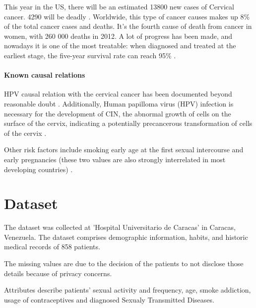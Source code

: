 This year in the US, there will be an estimated 13800 new cases of Cervical cancer. 4290 will be deadly \cite{acs}.
Worldwide, this type of cancer causes makes up 8\% of the total cancer cases and deaths. It's the fourth cause of death from cancer in women, with 260 000 deaths in 2012.
A lot of progress has been made, and nowadays it is one of the most treatable: when diagnosed and treated at the earliest stage, the five-year survival rate can reach 95\% \cite{cruk}.

\paragraph{Known causal relations}

HPV causal relation with the cervical cancer has been documented beyond reasonable doubt \cite{Bosch2002}. Additionally, Human papilloma virus (HPV) infection is necessary for the development of CIN, the abnormal growth of cells on the surface of the cervix, indicating a potentially precancerous transformation of cells of the cervix \cite{kumar2017robbins}.

Other risk factors include smoking \cite{Collins2010} early age at the first sexual intercourse and early pregnancies (these two values are also strongly interrelated in most developing countries) \cite{Louie2009}.

\section{Dataset}

The dataset was collected at 'Hospital Universitario de Caracas' in Caracas, Venezuela. The dataset comprises demographic information, habits, and historic medical records of 858 patients.

The missing values are due to the decision of the patients to not disclose those details because of privacy concerns.

Attributes describe patients’ sexual activity and frequency, age, smoke addiction, usage of contraceptives and diagnosed Sexualy Transmitted Diseases.

